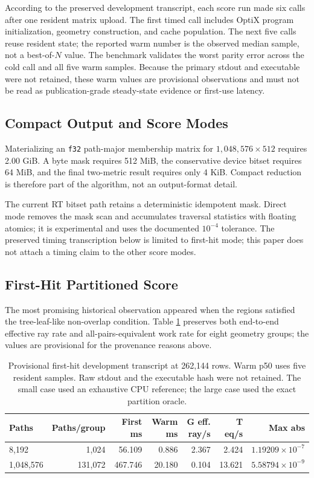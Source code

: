 \documentclass[11pt]{article}
\begin{document}
According to the preserved development transcript, each score run made six
calls after one resident matrix upload. The
first timed call includes OptiX program initialization, geometry construction,
and cache population. The next five calls reuse resident state; the reported
warm number is the observed median sample, not a best-of-$N$ value. The
benchmark validates the worst parity error across the cold call and all five
warm samples. Because the primary stdout and executable were not retained,
these warm values are provisional observations and must not be read as
publication-grade steady-state evidence or first-use latency.

\subsection{Compact Output and Score Modes}

Materializing an \texttt{f32} path-major membership matrix for
$1{,}048{,}576 \times 512$ requires 2.00 GiB. A byte mask requires 512 MiB,
the conservative device bitset requires 64 MiB, and the final two-metric result
requires only 4 KiB. Compact reduction is therefore part of the algorithm, not
an output-format detail.

The current RT bitset path retains a deterministic idempotent mask. Direct mode removes
the mask scan and accumulates traversal statistics with floating atomics; it is
experimental and uses the documented $10^{-4}$ tolerance. The preserved timing
transcription below is limited to first-hit mode; this paper does not attach a
timing claim to the other score modes.

\subsection{First-Hit Partitioned Score}

The most promising historical observation appeared when the regions satisfied the
tree-leaf-like non-overlap condition. Table \ref{tab:firsthit} preserves both
end-to-end effective ray rate and all-pairs-equivalent work rate for eight
geometry groups; the values are provisional for the provenance reasons above.

\begin{table}[H]
\centering
\small
\caption{Provisional first-hit development transcript at 262,144 rows. Warm p50
uses five resident samples. Raw stdout and the executable hash were not
retained. The small case used an exhaustive CPU reference; the large case used
the exact partition oracle.}
\label{tab:firsthit}
\begin{tabular}{@{}lrrrrrr@{}}
\toprule
Paths & Paths/group & First ms & Warm ms & G eff. ray/s & T eq/s & Max abs \\
\midrule
8,192 & 1,024 & 56.109 & 0.886 & 2.367 & 2.424 &
$1.19209{\times}10^{-7}$ \\
1,048,576 & 131,072 & 467.746 & 20.180 & 0.104 & 13.621 &
$5.58794{\times}10^{-9}$ \\
\bottomrule
\end{tabular}
\end{table}
\end{document}
